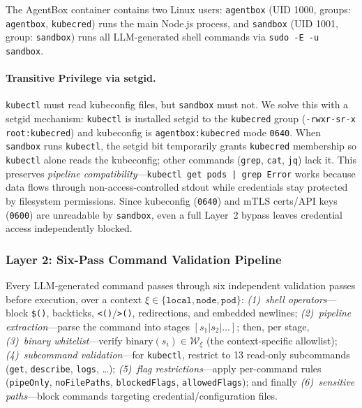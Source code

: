 \documentclass[letterpaper]{article}
\begin{document}
The AgentBox container contains two Linux users:
\texttt{agentbox} (UID 1000, groups: \texttt{agentbox}, \texttt{kubecred}) runs the main Node.js process, and
\texttt{sandbox} (UID 1001, group: \texttt{sandbox}) runs all LLM-generated shell commands via \texttt{sudo -E -u sandbox}.

\paragraph{Transitive Privilege via setgid.}
\texttt{kubectl} must read kubeconfig files, but \texttt{sandbox} must not. We solve this with a setgid mechanism: \texttt{kubectl} is installed setgid to the \texttt{kubecred} group (\texttt{-rwxr-sr-x root:kubecred}) and kubeconfig is \texttt{agentbox:kubecred} mode \texttt{0640}. When \texttt{sandbox} runs \texttt{kubectl}, the setgid bit temporarily grants \texttt{kubecred} membership so \texttt{kubectl} alone reads the kubeconfig; other commands (\texttt{grep}, \texttt{cat}, \texttt{jq}) lack it. This preserves \emph{pipeline compatibility}---\texttt{kubectl get pods | grep Error} works because data flows through non-access-controlled stdout while credentials stay protected by filesystem permissions. Since kubeconfig (\texttt{0640}) and mTLS certs/API keys (\texttt{0600}) are unreadable by \texttt{sandbox}, even a full Layer~2 bypass leaves credential access independently blocked.

\subsubsection{Layer 2: Six-Pass Command Validation Pipeline}

Every LLM-generated command passes through six independent validation passes before execution, over a context $\xi \in \{\texttt{local}, \texttt{node}, \texttt{pod}\}$:
\emph{(1)~shell operators}---block \texttt{\$()}, backticks, \texttt{<()}/\texttt{>()}, redirections, and embedded newlines;
\emph{(2)~pipeline extraction}---parse the command into stages $[s_1|s_2|\ldots]$;
then, per stage,
\emph{(3)~binary whitelist}---verify $\text{binary}(s_i)\in\mathcal{W}_\xi$ (the context-specific allowlist);
\emph{(4)~subcommand validation}---for \texttt{kubectl}, restrict to 13 read-only subcommands (\texttt{get}, \texttt{describe}, \texttt{logs}, \ldots);
\emph{(5)~flag restrictions}---apply per-command rules (\texttt{pipeOnly}, \texttt{noFilePaths}, \texttt{blockedFlags}, \texttt{allowedFlags});
and finally \emph{(6)~sensitive paths}---block commands targeting credential/configuration files.
\end{document}
